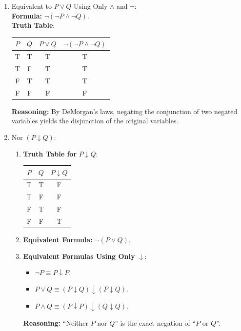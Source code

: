 \begin{enumerate}
\item Equivalent to $P \lor Q$ Using Only $\land$ and $\neg$: \\
  \textbf{Formula:} $\neg (\neg P \land \neg Q)$. \\
  \textbf{Truth Table}:
  \begin{center}
    \begin{tabular}{cccc}
      $P$ & $Q$ & $P \lor Q$ & $\neg (\neg P \land \neg Q)$ \\
      \midrule
      T & T & T & T \\
      T & F & T & T \\
      F & T & T & T \\
      F & F & F & F 
    \end{tabular}
  \end{center}
  \textbf{Reasoning:} By DeMorgan's laws, negating the conjunction of two negated variables yields the disjunction of the original variables.

\item Nor $(P \downarrow Q)$:
  \begin{enumerate}
  \item \textbf{Truth Table for} $P \downarrow Q$:
    \begin{center}
      \begin{tabular}{ccc}
        $P$ & $Q$ & $P \downarrow Q$ \\
        \midrule
        T & T & F \\
        T & F & F \\
        F & T & F \\
        F & F & T 
      \end{tabular}
    \end{center}
  \item \textbf{Equivalent Formula:} $\neg (P \lor Q)$.
  \item \textbf{Equivalent Formulas Using Only $\downarrow$}:
    \begin{itemize}
    \item $\neg P \equiv P \downarrow P$.
    \item $P \lor Q \equiv (P \downarrow Q) \downarrow (P \downarrow Q)$.
    \item $P \land Q \equiv (P \downarrow P) \downarrow (Q \downarrow Q)$.
    \end{itemize}
    \textbf{Reasoning:} ``Neither $P$ nor $Q$'' is the exact negation of ``$P$ or $Q$''.
  \end{enumerate}


\end{enumerate}
